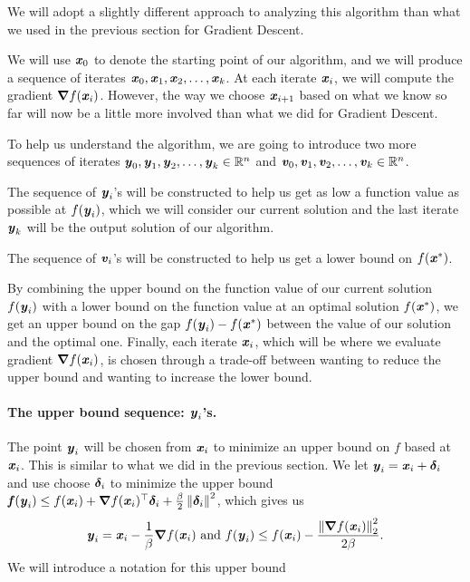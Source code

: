 
We will adopt a slightly different approach to analyzing this
algorithm than what we used in the previous section for Gradient Descent.

We will use $\boldsymbol{\mathit{x}}_0$ to denote the starting point of our algorithm, and
we will produce a sequence of iterates $\boldsymbol{\mathit{x}}_0, \boldsymbol{\mathit{x}}_1, \boldsymbol{\mathit{x}}_2, \ldots,
\boldsymbol{\mathit{x}}_k $.
At each iterate $\boldsymbol{\mathit{x}}_{i}$, we will compute the gradient $\boldsymbol{\nabla}
f(\boldsymbol{\mathit{x}}_{i})$.
However, the way we choose  $\boldsymbol{\mathit{x}}_{i+1}$ based on what we know so far
will now be a little more involved than what we did for Gradient Descent.

To help us understand the algorithm, we are going to introduce two
more sequences of iterates $\boldsymbol{\mathit{y}}_0, \boldsymbol{\mathit{y}}_1, \boldsymbol{\mathit{y}}_2, \ldots,
\boldsymbol{\mathit{y}}_k \in \mathbb{R}^n $ and $\boldsymbol{\mathit{v}}_0, \boldsymbol{\mathit{v}}_1, \boldsymbol{\mathit{v}}_2, \ldots,
\boldsymbol{\mathit{v}}_k \in \mathbb{R}^n$.

The sequence of $\boldsymbol{\mathit{y}}_i$'s will be constructed to help us get as low a
function value as possible at $f(\boldsymbol{\mathit{y}}_i)$, which we will consider our
current solution and the last iterate $\boldsymbol{\mathit{y}}_k$ will be the output solution of
our algorithm.

The sequence of $\boldsymbol{\mathit{v}}_i$'s will be constructed to help us get a lower
bound on $f(\boldsymbol{\mathit{x}}^*)$.

By combining the upper bound on the function value of our current
solution $f(\boldsymbol{\mathit{y}}_i)$ with a lower bound on the function value at an
optimal solution $f(\boldsymbol{\mathit{x}}^*)$, we get an upper bound on the gap
 $f(\boldsymbol{\mathit{y}}_i)-f(\boldsymbol{\mathit{x}}^*)$
between
the value of our solution and the optimal one.
Finally, each iterate $\boldsymbol{\mathit{x}}_i$, which will be where we evaluate
gradient $\boldsymbol{\nabla} f(\boldsymbol{\mathit{x}}_{i})$, is chosen through a trade-off between
wanting to reduce the upper bound and wanting to increase the lower bound.


\paragraph{The upper bound sequence: $\boldsymbol{\mathit{y}}_i$'s.}
The point $\boldsymbol{\mathit{y}}_i$ will be chosen from $\boldsymbol{\mathit{x}}_i$ to minimize an upper
bound on $f$ based at $\boldsymbol{\mathit{x}}_i$.
This is similar to what we did in the previous section.
We let $\boldsymbol{\mathit{y}}_i = \boldsymbol{\mathit{x}}_i +\boldsymbol{\delta}_i$
and use choose $\boldsymbol{\delta}_i$ to minimize the upper bound
$ \boldsymbol{\mathit{f}}(\boldsymbol{\mathit{y}}_i) \leq f(\boldsymbol{\mathit{x}}_{i})  + \boldsymbol{\nabla} f(\boldsymbol{\mathit{x}}_{i})^\top\boldsymbol{\delta}_i
      + \frac{\beta}{2} \left\| \boldsymbol{\delta}_i \right\|^2$, which gives us
\[
  \boldsymbol{\mathit{y}}_i = \boldsymbol{\mathit{x}}_{i}-\frac{1}{\beta}\boldsymbol{\nabla} f(\boldsymbol{\mathit{x}}_{i})
  \text{ and }
    f(\boldsymbol{\mathit{y}}_i) \leq f(\boldsymbol{\mathit{x}}_{i}) - \frac{\left\| \boldsymbol{\nabla}
                 f(\boldsymbol{\mathit{x}}_{i}) \right\|_2^2}{2\beta}
  .
\]
We will introduce a notation for this upper bound

